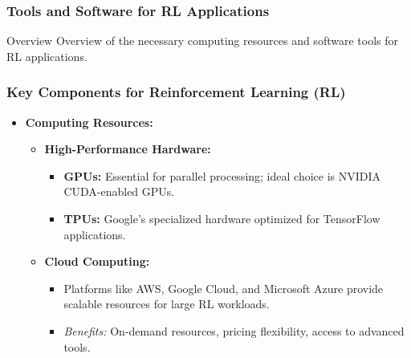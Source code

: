 \documentclass[aspectratio=169]{beamer}
\begin{document}
\begin{frame}[fragile]
    \frametitle{Tools and Software for RL Applications}
    \begin{block}{Overview}
        Overview of the necessary computing resources and software tools for RL applications.
    \end{block}
\end{frame}

\begin{frame}[fragile]
    \frametitle{Key Components for Reinforcement Learning (RL)}
    \begin{itemize}
        \item \textbf{Computing Resources:}
        \begin{itemize}
            \item \textbf{High-Performance Hardware:}
            \begin{itemize}
                \item \textbf{GPUs:} Essential for parallel processing; ideal choice is NVIDIA CUDA-enabled GPUs.
                \item \textbf{TPUs:} Google's specialized hardware optimized for TensorFlow applications.
            \end{itemize}
            \item \textbf{Cloud Computing:}
            \begin{itemize}
                \item Platforms like AWS, Google Cloud, and Microsoft Azure provide scalable resources for large RL workloads.
                \item \textit{Benefits:} On-demand resources, pricing flexibility, access to advanced tools.
            \end{itemize}
        \end{itemize}
    \end{itemize}
\end{frame}
\end{document}
